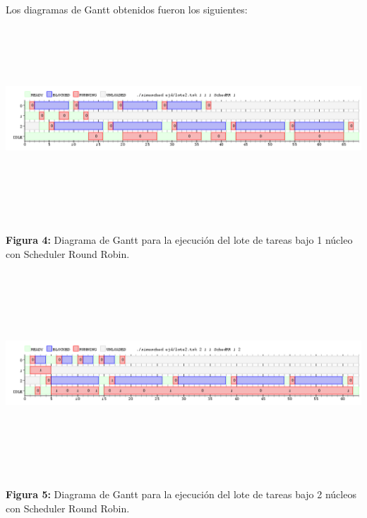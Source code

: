\documentclass[a4paper]{article}
\begin{document}
Los diagramas de Gantt obtenidos fueron los siguientes:\\


 \includegraphics[width=\textwidth,height=3.0in,keepaspectratio]{imagenes/ej4/1core.png} \newline
\begin {flushleft}
\textbf{Figura 4:} Diagrama de Gantt para la ejecuci\'on del lote de tareas bajo 1 n\'ucleo con Scheduler Round Robin.
\end{flushleft}

  \includegraphics[width=\textwidth,height=3.0in,keepaspectratio]{imagenes/ej4/2core.png} \newline
\begin {flushleft}
\textbf{Figura 5:} Diagrama de Gantt para la ejecuci\'on del lote de tareas bajo 2 n\'ucleos con Scheduler Round Robin.
\end{flushleft}
\end{document}
